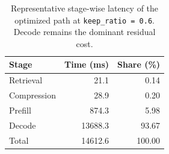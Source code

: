 \begin{table}[htbp]
\centering
\caption{Representative stage-wise latency of the optimized path at \texttt{keep\_ratio = 0.6}. Decode remains the dominant residual cost.}
\label{tab:latency-breakdown}
\small
\setlength{\tabcolsep}{6pt}
\begin{tabular}{l r r}
\hline
Stage & Time (ms) & Share (\%) \\
\hline
Retrieval & 21.1 & 0.14 \\
Compression & 28.9 & 0.20 \\
Prefill & 874.3 & 5.98 \\
Decode & 13688.3 & 93.67 \\
\hline
Total & 14612.6 & 100.00 \\
\hline
\end{tabular}
\end{table}
